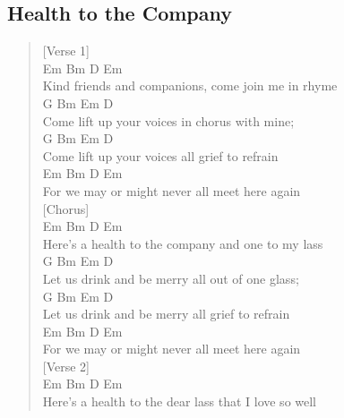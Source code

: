 \documentclass[11pt]{article}
\begin{document}
\subsection{Health to the Company}
\label{sec:org1483f6a}
\begin{verse}
[Verse 1]\\
\hspace*{5em}Em             Bm            D          Em\\
Kind friends and companions, come join me in rhyme\\
\hspace*{5em}G       Bm   Em                    D\\
Come lift up your voices in chorus with mine;\\
\hspace*{5em}G       Bm   Em                    D\\
Come lift up your voices all grief to refrain\\
\hspace*{7em}Em           Bm        D          Em\\
For we may or might never all meet here again\\
\vspace*{1em}
\vspace*{1em}
[Chorus]\\
\hspace*{9em}Em            Bm          D         Em\\
Here's a health to the company and one to my lass\\
\hspace*{7em}G         Bm Em                   D\\
Let us drink and be merry all out of one glass;\\
\hspace*{7em}G         Bm Em                   D\\
Let us drink and be merry all grief to refrain\\
\hspace*{7em}Em           Bm        D          Em\\
For we may or might never all meet here again\\
\vspace*{1em}
\vspace*{1em}
[Verse 2]\\
\hspace*{9em}Em            Bm             D         Em\\
Here's a health to the dear lass that I love so well\\

\end{verse}
\end{document}
